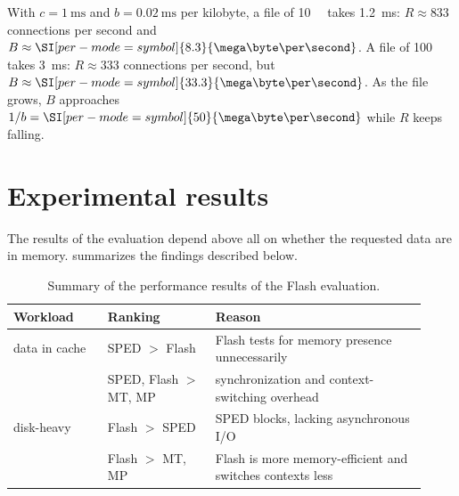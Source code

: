 \documentclass[../main.tex]{subfiles}
\begin{document}
\begin{example}
  With $c = \SI{1}{\milli\second}$ and $b = \SI{0.02}{\milli\second}$ per
  kilobyte, a file of \SI{10}{\kilo\byte} takes \SI{1.2}{\milli\second}:
  $R \approx 833$ connections per second and
  $B \approx \SI[per-mode=symbol]{8.3}{\mega\byte\per\second}$.  A file of
  \SI{100}{\kilo\byte} takes \SI{3}{\milli\second}: $R \approx 333$
  connections per second, but $B \approx \SI[per-mode=symbol]{33.3}{\mega\byte\per\second}$.
  As the file grows, $B$ approaches $1/b = \SI[per-mode=symbol]{50}{\mega\byte\per\second}$
  while $R$ keeps falling.
\end{example}

\section{Experimental results}
\label{sec:l06-results}

The results of the evaluation depend above all on whether the requested
data are in memory.
 summarizes the findings described
below.

\begin{table}[htbp]
  \centering
  \caption{Summary of the performance results of the Flash evaluation.}
  \label{tab:l06-results}
  \small
  \begin{tabular}{@{}>{\raggedright\arraybackslash}p{0.21\linewidth}>{\raggedright\arraybackslash}p{0.24\linewidth}>{\raggedright\arraybackslash}p{0.47\linewidth}@{}}
    \toprule
    Workload & Ranking & Reason \\
    \midrule
    data in cache & SPED $>$ Flash & Flash tests for memory presence
      unnecessarily \\
    & SPED, Flash $>$ MT, MP & synchronization and context-switching
      overhead \\
    \midrule
    disk-heavy & Flash $>$ SPED & SPED blocks, lacking asynchronous I/O \\
    & Flash $>$ MT, MP & Flash is more memory-efficient and switches
      contexts less \\
    \bottomrule
  \end{tabular}
\end{table}
\end{document}
